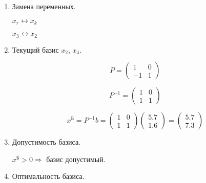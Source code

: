 \begin{enumerate}
\begin{enumerate}
	$r = argmin_i\left\{ \frac{x_i^{\text{Б}}}{z_i} \Bigl|_{z_i > 0} \right\}$
	
	$\frac{x^{\text{Б}}}{z} = \begin{pmatrix}
		\frac{5.7}{1} \\ \frac{1.6}{-1}
	\end{pmatrix}
	=
	\begin{pmatrix}
		5.7 \\ -1.6
	\end{pmatrix}$
	
	$r = 3$

	\item Замена переменных.
	
	$x_r \leftrightarrow x_k$
	
	$x_3 \leftrightarrow x_2$
	
	\item Текущий базис $x_2$, $x_4$.
	
	\begin{displaymath}
		P = \begin{pmatrix}
			1 & 0 \\ -1 & 1
		\end{pmatrix}
	\end{displaymath}	
	
	\begin{displaymath}
		P^{-1} = \begin{pmatrix}
			1 & 0 \\ 1 & 1
		\end{pmatrix}
	\end{displaymath}		
	
	\begin{displaymath}
		x^{\text{Б}} = P^{-1}b = \begin{pmatrix}
			1 & 0 \\ 1 & 1
		\end{pmatrix}
		\begin{pmatrix}
			5.7 \\ 1.6
		\end{pmatrix}
		=
		\begin{pmatrix}
			5.7 \\ 7.3
		\end{pmatrix}
	\end{displaymath}
	
	\item Допустимость базиса.
	
	$x^{\text{Б}} > 0 \Rightarrow$ базис допустимый.
	
	\item Оптимальность базиса.
	

\end{enumerate}
\end{enumerate}
